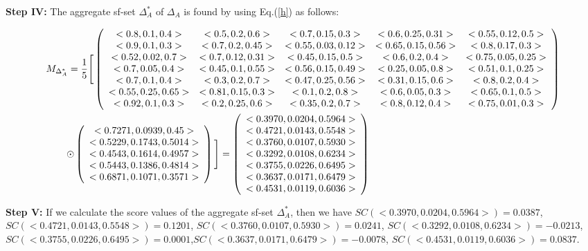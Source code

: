 \documentclass{IJFS}
\begin{document}
\textbf{Step IV:} The aggregate sf-set $\Delta_A^*$ of $\Delta_A$
is found by using Eq.(\ref{h}) as follows:
\begin{center}
\footnotesize{
\begin{eqnarray*}
 M_{\Delta_A^*}=\frac{1}{5} \Bigg[\left(
\begin{array}{c c c c c}
<0.8,0.1,0.4> &<0.5,0.2,0.6>&<0.7, 0.15, 0.3>&<0.6, 0.25,
0.31>&<0.55, 0.12, 0.5>
\\  <0.9, 0.1,0.3>&<0.7, 0.2,0.45>&<0.55,0.03, 0.12>&<0.65, 0.15, 0.56>&<0.8, 0.17, 0.3>\\
 <0.52, 0.02, 0.7>&<0.7, 0.12,0.31>&<0.45, 0.15, 0.5>&<0.6, 0.2, 0.4>&<0.75, 0.05,
 0.25>\\<0.7, 0.05, 0.4>&<0.45, 0.1, 0.55>&<0.56, 0.15,
 0.49>&<0.25, 0.05, 0.8>&<0.51, 0.1, 0.25>\\<0.7, 0.1,
 0.4>&<0.3, 0.2, 0.7>&<0.47, 0.25, 0.56>&<0.31, 0.15,
 0.6>&<0.8, 0.2, 0.4>\\<0.55,0.25, 0.65>&<0.81, 0.15,
 0.3>&<0.1, 0.2, 0.8>&<0.6, 0.05, 0.3>&<0.65,
 0.1,0.5>\\<0.92,0.1, 0.3>&<0.2, 0.25, 0.6>&<0.35, 0.2,
 0.7>&<0.8, 0.12, 0.4>&<0.75, 0.01, 0.3>
\end{array} \right)\\ \odot \left(
\begin{array}{c}
<0.7271,0.0939, 0.45>  \\
<0.5229, 0.1743, 0.5014>\\
<0.4543, 0.1614, 0.4957> \\
<0.5443, 0.1386, 0.4814>\\
<0.6871, 0.1071, 0.3571>
\end{array} \right)\Bigg]
= \left(
\begin{array}{c}
<0.3970, 0.0204, 0.5964> \\<0.4721, 0.0143, 0.5548> \\<0.3760,
0.0107,
0.5930> \\<0.3292, 0.0108, 0.6234>\\ <0.3755, 0.0226, 0.6495>\\
<0.3637, 0.0171, 0.6479> \\<0.4531, 0.0119, 0.6036>
\end{array} \right)~~~~~~~~~~~~~~~~~~~~~~~~~~~~~~~~~~~~~~~~~~~~~~~~~~~~~~~~~~~
\end{eqnarray*}}
\end{center}

\textbf{Step V:} If we calculate the score values of the
aggregate sf-set $\Delta_A^*$, then we have  $SC(<0.3970,
0.0204, 0.5964>)=0.0387$, $SC(<0.4721, 0.0143, 0.5548>)=0.1201$, 
$SC(<0.3760, 0.0107, 0.5930>)=0.0241$, $SC(<0.3292, 0.0108,
0.6234>)=-0.0213 $, $SC(<0.3755, 0.0226, 0.6495>)=0.0001
$,$SC(<0.3637, 0.0171, 0.6479>)=-0.0078$, \linebreak[4] $SC(<0.4531, 0.0119,
0.6036>)=0.0837$.
\end{document}
